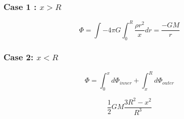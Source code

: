 \documentclass{article}
\newtheorem{one minute paper}[theorem]{One Minute Paper}
\begin{document}
\subsubsection*{Case 1 : $x > R$}

\begin{equation}
    \Phi = \int -4\pi G \int_{0}^{R} \frac{\rho r^2}{x}dr = \frac{-GM}{r}
\end{equation}

\subsubsection*{Case 2: $x < R$}

\begin{equation}
    \Phi = \int_{0}^{x}d\Phi_{inner} + \int_{x}^{R}d\Phi_{outer}
\end{equation}

\begin{equation}
    \frac{1}{2}GM \frac{3R^2 - x^2}{R^3}
\end{equation}
\end{document}
